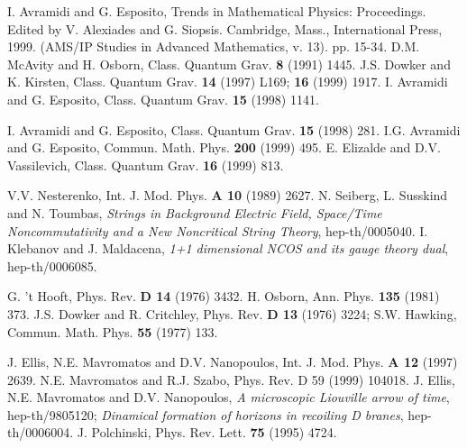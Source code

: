 \documentclass[a4paper,12pt]{article}
\begin{document}
\begin{thebibliography}{99}
I. Avramidi and G. Esposito,
Trends in Mathematical Physics: Proceedings. 
Edited by V. Alexiades and G. Siopsis.
Cambridge, Mass., International Press, 1999. 
(AMS/IP Studies in Advanced Mathematics,
v. 13). pp. 15-34. 
 D.M. McAvity and H. Osborn, Class. Quantum Grav. 
\textbf{8} (1991) 1445. 
 J.S. Dowker and K. Kirsten, Class. Quantum Grav. 
\textbf{14} (1997) L169; \textbf{16}
(1999) 1917.
 I. Avramidi and G. Esposito, Class. Quantum Grav. 
\textbf{15} (1998) 1141. 
 
 I. Avramidi and G. Esposito, Class. Quantum Grav. 
\textbf{15} (1998) 281.  
 I.G. Avramidi and G. Esposito, 
Commun. Math. Phys. \textbf{200} (1999) 495.
 E. Elizalde and D.V. Vassilevich, 
Class. Quantum Grav. \textbf{16} (1999) 813.

V.V. Nesterenko, Int. J. Mod. Phys. \textbf{A 10} (1989) 2627.
N. Seiberg, L. Susskind and N. Toumbas,
{\it Strings in Background Electric Field, Space/Time
Noncommutativity and a New Noncritical String Theory},
hep-th/0005040.
I. Klebanov and J. Maldacena, {\it 1+1 dimensional NCOS and
its \coordHE{} gauge theory dual}, hep-th/0006085.

G. 't Hooft, Phys. Rev. {\bf D 14} (1976) 3432.
H. Osborn, Ann. Phys. {\bf 135} (1981) 373.
J.S. Dowker and R. Critchley, Phys. Rev. 
\textbf{D 13} (1976) 3224; S.W. Hawking,
Commun. Math. Phys. \textbf{55} (1977) 133. 


J. Ellis, N.E. Mavromatos and D.V. Nanopoulos,
Int. J. Mod. Phys. {\bf A 12} (1997) 2639.
N.E. Mavromatos and R.J. Szabo, Phys. Rev. {D 59} (1999) 104018.
J. Ellis, N.E. Mavromatos and D.V. Nanopoulos, {\it
A microscopic Liouville arrow of time}, hep-th/9805120;
{\it Dinamical formation of horizons in recoiling
D branes}, hep-th/0006004.
J. Polchinski, Phys. Rev. Lett. {\bf 75} (1995) 4724.


\end{thebibliography}
\end{document}
